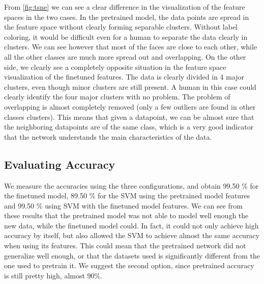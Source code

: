 \documentclass{article}
\begin{document}
From \cref{fig:tsne} we can see a clear difference in the visualization of the feature spaces in the two cases. In the pretrained model, the data points are spread in the feature space without clearly forming separable clusters. Without label coloring, it would be difficult even for a human to separate the data clearly in clusters. We can see however that most of the faces are close to each other, while all the other classes are much more spread out and overlapping. On the other side, we clearly see a completely opposite situation in the feature space visualization of the finetuned features. The data is clearly divided in 4 major clusters, even though minor clusters are still present. A human in this case could clearly identify the four major clusters with no problem. The problem of overlapping is almost completely removed (only a few outliers are found in other classes clusters). This means that given a datapoint, we can be almost sure that the neighboring datapoints are of the same class, which is a very good indicator that the network understands the main characteristics of the data.

\subsection{Evaluating Accuracy}

We measure the accuracies using the three configurations, and obtain 99.50 $\%$ for the finetuned model, 89.50 $\%$ for the SVM using the pretrained model features and 99.50 $\%$ using SVM with the finetuned model features. We can see from these results that the pretrained model was not able to model well enough the new data, while the finetuned model could. In fact, it could not only achieve high accuracy by itself, but also allowed the SVM to achieve almost the same accuracy when using its features. This could mean that the pretrained network did not generalize well enough, or that the datasets used is significantly different from the one used to pretrain it. We suggest the second option, since pretrained accuracy is still pretty high, almost $90\%$.
\end{document}
